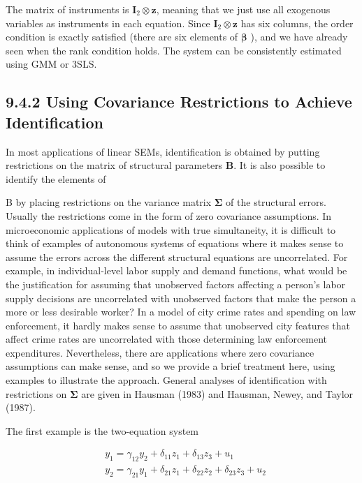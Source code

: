 \documentclass[10pt]{article}
\begin{document}
The matrix of instruments is $\mathbf{I}_{2} \otimes \mathbf{z}$, meaning that we just use all exogenous variables as instruments in each equation. Since $\mathbf{I}_{2} \otimes \mathbf{z}$ has six columns, the order condition is exactly satisfied (there are six elements of $\boldsymbol{\beta}$ ), and we have already seen when the rank condition holds. The system can be consistently estimated using GMM or 3SLS.

\subsection*{9.4.2 Using Covariance Restrictions to Achieve Identification}
In most applications of linear SEMs, identification is obtained by putting restrictions on the matrix of structural parameters $\mathbf{B}$. It is also possible to identify the elements of

B by placing restrictions on the variance matrix $\boldsymbol{\Sigma}$ of the structural errors. Usually the restrictions come in the form of zero covariance assumptions. In microeconomic applications of models with true simultaneity, it is difficult to think of examples of autonomous systems of equations where it makes sense to assume the errors across the different structural equations are uncorrelated. For example, in individual-level labor supply and demand functions, what would be the justification for assuming that unobserved factors affecting a person's labor supply decisions are uncorrelated with unobserved factors that make the person a more or less desirable worker? In a model of city crime rates and spending on law enforcement, it hardly makes sense to assume that unobserved city features that affect crime rates are uncorrelated with those determining law enforcement expenditures. Nevertheless, there are applications where zero covariance assumptions can make sense, and so we provide a brief treatment here, using examples to illustrate the approach. General analyses of identification with restrictions on $\boldsymbol{\Sigma}$ are given in Hausman (1983) and Hausman, Newey, and Taylor (1987).

The first example is the two-equation system


\begin{align*}
& y_{1}=\gamma_{12} y_{2}+\delta_{11} z_{1}+\delta_{13} z_{3}+u_{1}  \tag{9.35}\\
& y_{2}=\gamma_{21} y_{1}+\delta_{21} z_{1}+\delta_{22} z_{2}+\delta_{23} z_{3}+u_{2} \tag{9.36}
\end{align*}
\end{document}
